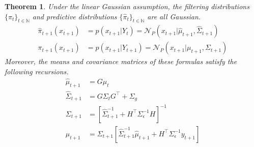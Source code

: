 \documentclass[12pt]{article}
\newtheorem{thm}{Theorem}
\begin{document}
\begin{thm}
Under the linear Gaussian assumption, the filtering distributions $\{\pi_t\}_{t \in \mathbb{N}}$ and predictive distributions $\{\hat{\pi}_{t}\}_{t \in \mathbb{N}}$ are all 
Gaussian. 
\begin{align*}
\hat{\pi}_{t+1}(x_{t+1}) &= p(x_{t+1}|Y_{t}) = \mathcal{N}_P(x_{t+1}|\hat{\mu}_{t+1}, \hat{\Sigma}_{t+1}) \\
\pi_{t+1}(x_{t+1}) &= p(x_{t+1}|Y_{t+1}) = \mathcal{N}_P(x_{t+1}|\mu_{t+1}, \Sigma_{t+1})
\end{align*}
Moreover, the means and covariance matrices of these formulas satisfy the following recursions. 
\begin{align*}
\hat{\mu}_{t + 1} &= G \mu_{t} \\
\hat{\Sigma}_{t + 1} &= G \Sigma_t G^\top + \Sigma_g \\
\Sigma_{t + 1} &= \left[\hat{\Sigma}^{-1}_{t + 1} + H^\top \Sigma_{\epsilon}^{-1} H \right]^{-1} \\
\mu_{t + 1} &= \Sigma_{t + 1} \left[\hat{\Sigma}^{-1}_{t + 1}\hat{\mu}_{t + 1} + H^\top \Sigma_{\epsilon}^{-1} y_{t+1} \right] 
\end{align*}
\end{thm}
\end{document}

